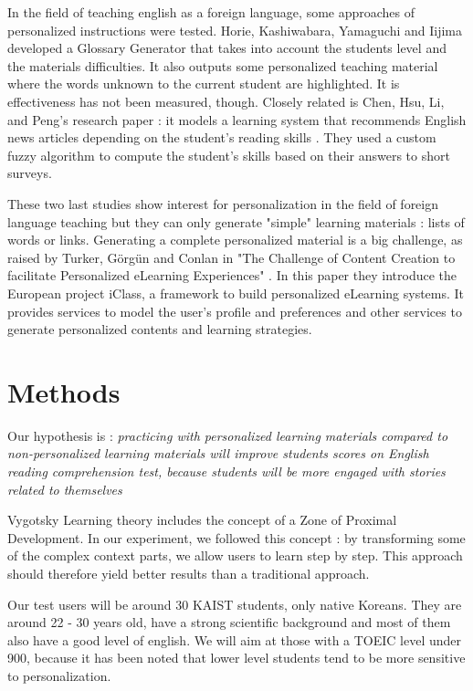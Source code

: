 \documentclass[a4paper,12pt]{article}
\begin{document}
In the field of teaching english as a foreign language, some approaches of personalized instructions were tested. Horie, Kashiwabara, Yamaguchi and Iijima developed a Glossary Generator \cite{iijima_wordlist_generator} that takes into account the students level and the materials difficulties. It also outputs some personalized teaching material where the words unknown to the current student are highlighted. It is effectiveness has not been measured, though. Closely related is Chen, Hsu, Li, and Peng's research paper : it models a learning system that recommends English news articles depending on the student's reading skills \cite{chen_mlearning}. They used a custom fuzzy algorithm to compute the student's skills based on their answers to short surveys.

These two last studies show interest for personalization in the field of foreign language teaching but they can only generate "simple" learning materials : lists of words or links. Generating a complete personalized material is a big challenge, as raised by Turker, Görgün and Conlan in "The Challenge of Content Creation to facilitate Personalized eLearning Experiences" \cite{turker_challenge_creation}. In this paper they introduce the European project iClass, a framework to build personalized eLearning systems. It provides services to model the user's profile and preferences and other services to generate personalized contents and learning strategies.


\section{Methods}

Our hypothesis is :
\textit{practicing with personalized learning materials compared to non-personalized learning materials will improve students scores on English reading comprehension test, because students will be more engaged with stories related to themselves}

Vygotsky Learning theory includes the concept of a Zone of Proximal Development. In our experiment, we followed this concept : by transforming some of the complex context parts, we allow users to learn step by step. This approach should therefore yield better results than a traditional approach.

Our test users will be around 30 KAIST students, only native Koreans. They are around 22 - 30 years old, have a strong scientific background and most of them also have a good level of english. We will aim at those with a TOEIC level under 900, because it has been noted that lower level students tend to be more sensitive to personalization.
\end{document}
